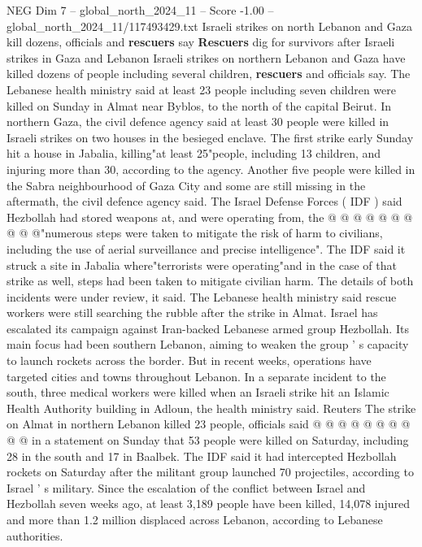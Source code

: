 \begin{textsample}{NEG Dim 7 – global\_north\_2024\_11 – Score -1.00 – global\_north\_2024\_11/117493429.txt}  \label{ex:f7_neg_343}
Israeli strikes on north Lebanon and Gaza kill dozens, officials and \textbf{rescuers} say \textbf{Rescuers} dig for survivors after Israeli strikes in Gaza and Lebanon Israeli strikes on northern Lebanon and Gaza have killed dozens of people including several children, \textbf{rescuers} and officials say.
The Lebanese health ministry said at least 23 people including seven children were killed on Sunday in Almat near Byblos, to the north of the capital Beirut.
In northern Gaza, the civil defence agency said at least 30 people were killed in Israeli strikes on two houses in the besieged enclave.
The first strike early Sunday hit a house in Jabalia, killing"at least 25"people, including 13 children, and injuring more than 30, according to the agency.
Another five people were killed in the Sabra neighbourhood of Gaza City and some are still missing in the aftermath, the civil defence agency said.
The Israel Defense Forces ( IDF ) said Hezbollah had stored weapons at, and were operating from, the @ @ @ @ @ @ @ @ @ @"numerous steps were taken to mitigate the risk of harm to civilians, including the use of aerial surveillance and precise intelligence".
The IDF said it struck a site in Jabalia where"terrorists were operating"and in the case of that strike as well, steps had been taken to mitigate civilian harm.
The details of both incidents were under review, it said.
The Lebanese health ministry said rescue workers were still searching the rubble after the strike in Almat.
Israel has escalated its campaign against Iran-backed Lebanese armed group Hezbollah.
Its main focus had been southern Lebanon, aiming to weaken the group ' s capacity to launch rockets across the border.
But in recent weeks, operations have targeted cities and towns throughout Lebanon.
In a separate incident to the south, three medical workers were killed when an Israeli strike hit an Islamic Health Authority building in Adloun, the health ministry said.
Reuters The strike on Almat in northern Lebanon killed 23 people, officials said @ @ @ @ @ @ @ @ @ @ in a statement on Sunday that 53 people were killed on Saturday, including 28 in the south and 17 in Baalbek.
The IDF said it had intercepted Hezbollah rockets on Saturday after the militant group launched 70 projectiles, according to Israel ' s military.
Since the escalation of the conflict between Israel and Hezbollah seven weeks ago, at least 3,189 people have been killed, 14,078 injured and more than 1.2 million displaced across Lebanon, according to Lebanese authorities.

\end{textsample}
